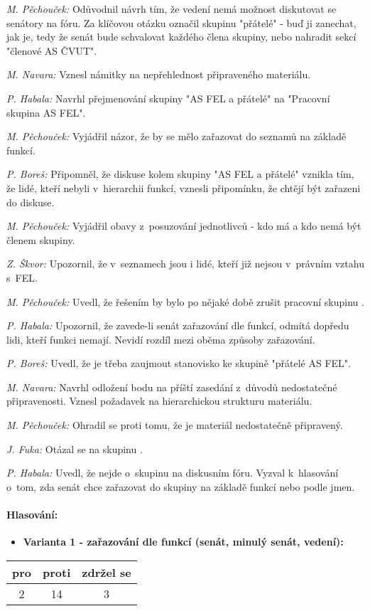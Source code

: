 \documentclass[a4paper,12pt,notitlepage,oneside]{article}
\newcommand{\hlasovani}[3]{\begin{center}
\begin{tabular}{|c|c|c|}\hline
pro& proti & zdržel se \\ \hline
#1 & #2 & #3 \\ \hline
\end{tabular}
\end{center}}
\begin{document}
\textit{M. Pěchouček:} Odůvodnil návrh tím, že vedení nemá možnost diskutovat se senátory na fóru. Za klíčovou otázku označil skupinu "přátelé" - buď ji zanechat, jak je, tedy že senát bude schvalovat každého člena skupiny, nebo nahradit sekcí "členové AS ČVUT".

\textit{M. Navara:} Vznesl námitky na nepřehlednost připraveného materiálu.

\textit{P. Habala:} Navrhl přejmenování skupiny "AS FEL a přátelé" na "Pracovní skupina AS FEL".

\textit{M. Pěchouček:} Vyjádřil názor, že by se mělo zařazovat do seznamů na základě funkcí.

\textit{P. Boreš:} Připomněl, že diskuse kolem skupiny "AS FEL a přátelé" vznikla tím, že lidé, kteří nebyli v~hierarchii funkcí, vznesli připomínku, že chtějí být zařazeni do diskuse.

\textit{M. Pěchouček:} Vyjádřil obavy z~posuzování jednotlivců - kdo má a kdo nemá být členem skupiny.

\textit{Z. Škvor:} Upozornil, že v~seznamech jsou i lidé, kteří již nejsou v~právním vztahu s~FEL.

\textit{M. Pěchouček:} Uvedl, že řešením by bylo po nějaké době zrušit pracovní skupinu .

\textit{P. Habala:} Upozornil, že zavede-li senát zařazování dle funkcí, odmítá dopředu lidi, kteří funkci nemají. Nevidí rozdíl mezi oběma způsoby zařazování.

\textit{P. Boreš:} Uvedl, že je třeba zaujmout stanovisko ke skupině "přátelé AS FEL".

\textit{M. Navara:} Navrhl odložení bodu na příští zasedání z~důvodů nedostatečné připravenosti. Vznesl požadavek na hierarchickou strukturu materiálu.

\textit{M. Pěchouček:} Ohradil se proti tomu, že je materiál nedostatečně připravený.

\textit{J. Fuka:} Otázal se na skupinu .

\textit{P. Habala:} Uvedl, že nejde o~skupinu na diskusním fóru. Vyzval k~hlasování o~tom, zda senát chce zařazovat do skupiny na základě funkcí nebo podle jmen.

\newpage\paragraph{Hlasování:}
\begin{itemize}
\item \textbf{Varianta 1 - zařazování dle funkcí (senát, minulý senát, vedení):}
\end{itemize}
\hlasovani{2}{14}{3}
\end{document}
